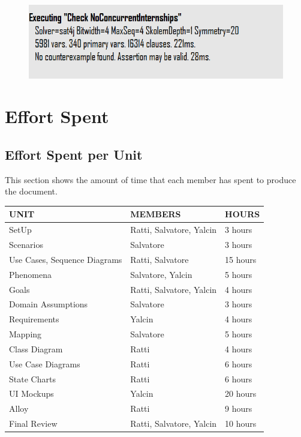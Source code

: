 \documentclass[a4paper,12pt]{article}
\begin{document}
\begin{figure}[H]
    \centering
    \includegraphics[width=1\textwidth]{figures/alloy/assertion.png}
    \centering
\end{figure}
\section{Effort Spent}
\subsection{Effort Spent per Unit}
This section shows the amount of time that each member has spent to produce the document. 

\begin{center}
    \begin{tabular}{|m{5cm}|m{5cm}|m{2cm}|}
        \hline
        \textbf{UNIT} & \textbf{MEMBERS} & \textbf{HOURS} \\ \hline
        SetUp & Ratti, Salvatore, Yalcin & 3 hours \\ \hline
        Scenarios & Salvatore & 3 hours \\ \hline
        Use Cases, Sequence Diagrams & Ratti, Salvatore & 15 hours \\ \hline
        Phenomena & Salvatore, Yalcin  & 5 hours \\ \hline
        Goals & Ratti, Salvatore, Yalcin & 4 hours \\ \hline
        Domain Assumptions & Salvatore & 3 hours \\ \hline
        Requirements & Yalcin & 4 hours \\ \hline
        Mapping & Salvatore & 5 hours \\ \hline
        Class Diagram & Ratti & 4 hours \\ \hline
        Use Case Diagrams & Ratti & 6 hours \\ \hline
        State Charts & Ratti & 6 hours \\ \hline
        UI Mockups & Yalcin & 20 hours \\ \hline
        Alloy & Ratti & 9 hours \\ \hline
        Final Review & Ratti, Salvatore, Yalcin & 10 hours\\ \hline
    \end{tabular}
\end{center}
\end{document}

